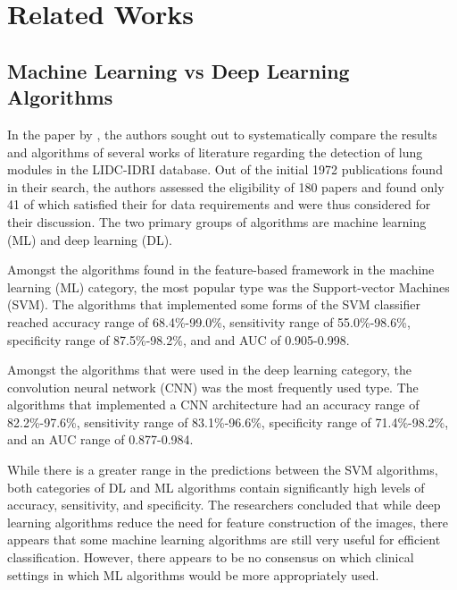 \documentclass[10pt,twocolumn,letterpaper]{article}
\begin{document}

\section{Related Works} \label{sec:related}

   \subsection{Machine Learning vs Deep Learning Algorithms} \label{sec:related-dl-vs-ml}
      In the paper by \cite{ml_vs_dl}, the authors sought out to systematically compare the results and algorithms of
      several works of literature regarding the detection of lung modules in the LIDC-IDRI database.
      Out of the initial 1972 publications found in their search, the authors assessed the eligibility of 180 papers
      and found only 41 of which satisfied their for data requirements and were thus considered for their discussion.
      The two primary groups of algorithms are machine learning (ML) and deep learning (DL).

      Amongst the algorithms found in the feature-based framework in the machine learning (ML) category, the most popular
      type was the Support-vector Machines (SVM). The algorithms that implemented some forms of the SVM classifier
      reached accuracy range of 68.4\%-99.0\%, sensitivity range of 55.0\%-98.6\%, specificity range of 87.5\%-98.2\%, and
      and AUC of 0.905-0.998.
    
      Amongst the algorithms that were used in the deep learning category, the convolution neural network (CNN) was the most
      frequently used type. The algorithms that implemented a CNN architecture had an accuracy range of 82.2\%-97.6\%,
      sensitivity range of 83.1\%-96.6\%, specificity range of 71.4\%-98.2\%, and an AUC range of 0.877-0.984.
    
      While there is a greater range in the predictions between the SVM algorithms, both categories of DL and ML algorithms
      contain significantly high levels of accuracy, sensitivity, and specificity. The researchers concluded that
      while deep learning algorithms reduce the need for feature construction of the images, there appears that some
      machine learning algorithms are still very useful for efficient classification. However, there appears to be no
      consensus on which clinical settings in which ML algorithms would be more appropriately used.
\end{document}
